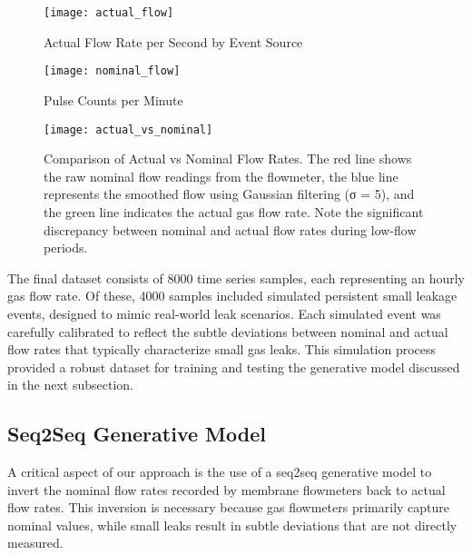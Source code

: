 \documentclass[10pt, sigconf]{acmart}
\begin{document}
\begin{figure}[htbp]  %
  \centering
  \texttt{[image: actual\_flow]}
  \caption{Actual Flow Rate per Second by Event Source}
  \label{fig:actual_flow}
\end{figure}

\begin{figure}[htbp]  %
  \centering
  \texttt{[image: nominal\_flow]}
  \caption{Pulse Counts per Minute}
  \label{fig:nominal_flow}
\end{figure}

\begin{figure}[htbp]
  \centering
  \texttt{[image: actual\_vs\_nominal]}
  \caption{Comparison of Actual vs Nominal Flow Rates. The red line shows the raw nominal flow readings from the flowmeter, the blue line represents the smoothed flow using Gaussian filtering (σ = 5), and the green line indicates the actual gas flow rate. Note the significant discrepancy between nominal and actual flow rates during low-flow periods.}
  \label{fig:actual_vs_nominal}
\end{figure}

The final dataset consists of 8000 time series samples, each representing an hourly gas flow rate. Of these, 4000 samples included simulated persistent small leakage events, designed to mimic real-world leak scenarios. Each simulated event was carefully calibrated to reflect the subtle deviations between nominal and actual flow rates that typically characterize small gas leaks. This simulation process provided a robust dataset for training and testing the generative model discussed in the next subsection.

\subsection{Seq2Seq Generative Model}

A critical aspect of our approach is the use of a seq2seq generative model to invert the nominal flow rates recorded by membrane flowmeters back to actual flow rates. This inversion is necessary because gas flowmeters primarily capture nominal values, while small leaks result in subtle deviations that are not directly measured.
\end{document}
